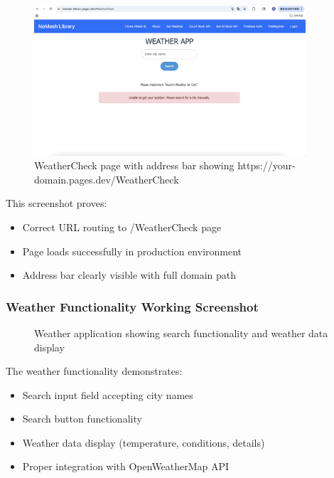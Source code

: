 \documentclass[12pt,a4paper]{article}
\begin{document}
\begin{figure}[H]
\centering
\includegraphics[width=0.9\textwidth]{weather_page_addressbar.png}
\caption{WeatherCheck page with address bar showing https://your-domain.pages.dev/WeatherCheck}
\end{figure}

This screenshot proves:
\begin{itemize}
\item Correct URL routing to /WeatherCheck page
\item Page loads successfully in production environment
\item Address bar clearly visible with full domain path
\end{itemize}

\subsubsection{Weather Functionality Working Screenshot}

\begin{figure}[H]
\centering
\caption{Weather application showing search functionality and weather data display}
\end{figure}

The weather functionality demonstrates:
\begin{itemize}
\item Search input field accepting city names
\item Search button functionality
\item Weather data display (temperature, conditions, details)
\item Proper integration with OpenWeatherMap API
\end{itemize}
\end{document}
